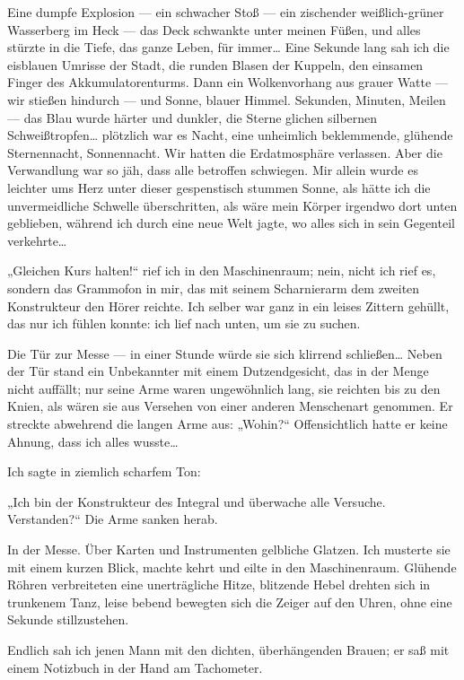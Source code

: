 Eine dumpfe Explosion — ein schwacher Stoß — ein zischender
weißlich-grüner Wasserberg im Heck — das Deck schwankte unter
meinen Füßen, und alles stürzte in die Tiefe, das ganze Leben, für
immer\ldots{} Eine Sekunde lang sah ich die eisblauen Umrisse der Stadt,
die runden Blasen der Kuppeln, den einsamen Finger des
Akkumulatorenturms. Dann ein Wolkenvorhang aus grauer Watte — wir
stießen hindurch — und Sonne, blauer Himmel. Sekunden, Minuten,
Meilen — das Blau wurde härter und dunkler, die Sterne glichen
silbernen Schweißtropfen\ldots{}
plötzlich war es Nacht, eine unheimlich beklemmende, glühende
Sternennacht, Sonnennacht. Wir hatten die Erdatmosphäre verlassen.
Aber die Verwandlung war so jäh, dass alle betroffen schwiegen. Mir
allein wurde es leichter ums Herz unter dieser gespenstisch stummen
Sonne, als hätte ich die unvermeidliche Schwelle überschritten, als
wäre mein Körper irgendwo dort unten geblieben, während ich durch
eine neue Welt jagte, wo alles sich in sein Gegenteil verkehrte\ldots{}

„Gleichen Kurs halten!“ rief ich in den Maschinenraum; nein, nicht
ich rief es, sondern das Grammofon in mir, das mit seinem
Scharnierarm dem zweiten Konstrukteur den Hörer reichte. Ich selber
war ganz in ein leises Zittern gehüllt, das nur ich fühlen konnte:
ich lief nach unten, um sie zu suchen.

Die Tür zur Messe — in einer Stunde würde sie sich klirrend
schließen\ldots{} Neben der Tür stand ein Unbekannter mit einem
Dutzendgesicht, das in der Menge nicht auffällt; nur seine Arme
waren ungewöhnlich lang, sie reichten bis zu den Knien, als wären
sie aus Versehen von einer anderen Menschenart genommen. Er
streckte abwehrend die langen Arme aus: „Wohin?“ Offensichtlich
hatte er keine Ahnung, dass ich alles wusste\ldots{}

Ich sagte in ziemlich scharfem Ton:

„Ich bin der Konstrukteur des Integral und überwache alle Versuche.
Verstanden?“ Die Arme sanken herab.

In der Messe. Über Karten und Instrumenten gelbliche Glatzen. Ich
musterte sie mit einem kurzen Blick, machte kehrt und eilte in den
Maschinenraum. Glühende Röhren verbreiteten eine unerträgliche
Hitze, blitzende Hebel drehten sich in trunkenem Tanz, leise bebend
bewegten
sich die Zeiger auf den Uhren, ohne eine Sekunde stillzustehen.

Endlich sah ich jenen Mann mit den dichten, überhängenden Brauen;
er saß mit einem Notizbuch in der Hand am Tachometer.

